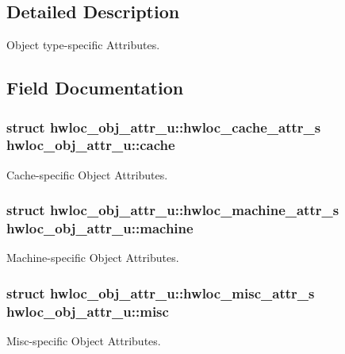 \subsection{Detailed Description}
Object type-specific Attributes. 

\subsection{Field Documentation}
\hypertarget{unionhwloc__obj__attr__u_b5a8ae3bf490e6b1071fea53f7382836}{
\subsubsection[{cache}]{\setlength{\rightskip}{0pt plus 5cm}struct {\bf hwloc\_\-obj\_\-attr\_\-u::hwloc\_\-cache\_\-attr\_\-s}  {\bf hwloc\_\-obj\_\-attr\_\-u::cache}}}
\label{unionhwloc__obj__attr__u_b5a8ae3bf490e6b1071fea53f7382836}


Cache-specific Object Attributes. 

\hypertarget{unionhwloc__obj__attr__u_5b42966df7c5bfdc36891e414cc31607}{
\subsubsection[{machine}]{\setlength{\rightskip}{0pt plus 5cm}struct {\bf hwloc\_\-obj\_\-attr\_\-u::hwloc\_\-machine\_\-attr\_\-s}  {\bf hwloc\_\-obj\_\-attr\_\-u::machine}}}
\label{unionhwloc__obj__attr__u_5b42966df7c5bfdc36891e414cc31607}


Machine-specific Object Attributes. 

\hypertarget{unionhwloc__obj__attr__u_33b7e687b61be1b62e22f4037788582c}{
\subsubsection[{misc}]{\setlength{\rightskip}{0pt plus 5cm}struct {\bf hwloc\_\-obj\_\-attr\_\-u::hwloc\_\-misc\_\-attr\_\-s}  {\bf hwloc\_\-obj\_\-attr\_\-u::misc}}}
\label{unionhwloc__obj__attr__u_33b7e687b61be1b62e22f4037788582c}


Misc-specific Object Attributes. 


